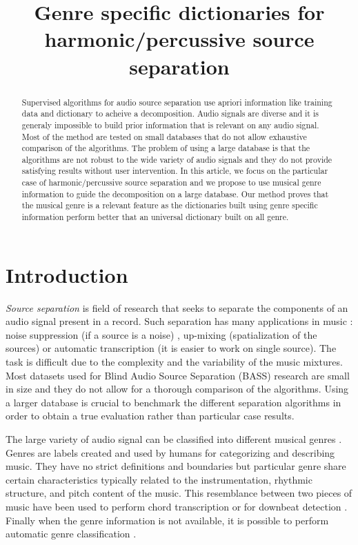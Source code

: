 \documentclass{article}
\title{Genre specific dictionaries for harmonic/percussive source separation}
\begin{document}
%
\maketitle
%
\begin{abstract}

Supervised algorithms for audio source separation use apriori information like training data and dictionary to acheive a decomposition. Audio signals are diverse and it is generaly impossible to build prior information that is relevant on any audio signal. Most of the method are tested on small databases that do not allow exhaustive comparison of the algorithms. The problem of using a large database is that the algorithms are not robust to the wide variety of audio signals and they do not provide satisfying results without user intervention. In this article, we focus on the particular case of harmonic/percussive source separation and we propose to use musical genre information to guide the decomposition on a large database. Our method proves that the musical genre is a relevant feature as the dictionaries built using genre specific information perform better that an universal dictionary built on all genre.  



\end{abstract}
%
\section{Introduction}\label{sec:introduction}


\emph{Source separation} is field of ​​research that seeks to separate the components of an audio signal present in a record. Such separation has many applications in music : noise suppression \cite{boll1979suppression} (if a source is a noise) , up-mixing \cite{fitzgerald2011upmixing}(spatialization of the sources) or automatic transcription \cite{Bertin07} (it is easier to work on single source). The task is difficult due to the complexity and the variability of the music mixtures. Most datasets used for Blind Audio Source Separation (BASS) research are small in size and they do not allow for a thorough comparison of the algorithms. Using a larger database is crucial to benchmark the different separation algorithms in order to obtain a true evaluation rather than particular case results. 

The large variety of audio signal can be classified into different musical genres \cite{tzanetakis2002musical}. Genres are labels created and used by humans for categorizing and describing music. They have no strict definitions and boundaries but particular genre share certain characteristics typically related to the instrumentation, rhythmic structure, and pitch content of the music. This resemblance between two pieces of music have been used to perform chord transcription \cite{ni2012using,lee2008acoustic} or for downbeat detection \cite{hockman2012one}. Finally when the genre information is not available, it is possible to perform automatic genre classification \cite{li2003comparative}.
\end{document}
